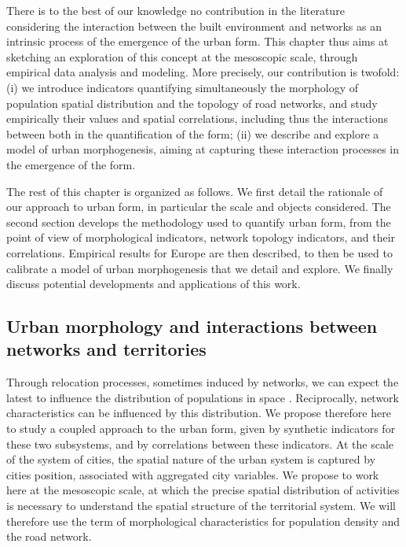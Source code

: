 \documentclass[11pt]{article}
\begin{document}
There is to the best of our knowledge no contribution in the literature considering the interaction between the built environment and networks as an intrinsic process of the emergence of the urban form. This chapter thus aims at sketching an exploration of this concept at the mesoscopic scale, through empirical data analysis and modeling. More precisely, our contribution is twofold: (i) we introduce indicators quantifying simultaneously the morphology of population spatial distribution and the topology of road networks, and study empirically their values and spatial correlations, including thus the interactions between both in the quantification of the form; (ii) we describe and explore a model of urban morphogenesis, aiming at capturing these interaction processes in the emergence of the form.


The rest of this chapter is organized as follows. We first detail the rationale of our approach to urban form, in particular the scale and objects considered. The second section develops the methodology used to quantify urban form, from the point of view of morphological indicators, network topology indicators, and their correlations. Empirical results for Europe are then described, to then be used to calibrate a model of urban morphogenesis that we detail and explore. We finally discuss potential developments and applications of this work.


\subsection{Urban morphology and interactions between networks and territories}

Through relocation processes, sometimes induced by networks, we can expect the latest to influence the distribution of populations in space \citep{wegener2004land}. Reciprocally, network characteristics can be influenced by this distribution. We propose therefore here to study a coupled approach to the urban form, given by synthetic indicators for these two subsystems, and by correlations between these indicators. At the scale of the system of cities, the spatial nature of the urban system is captured by cities position, associated with aggregated city variables. We propose to work here at the mesoscopic scale, at which the precise spatial distribution of activities is necessary to understand the spatial structure of the territorial system. We will therefore use the term of morphological characteristics for population density and the road network.
\end{document}

